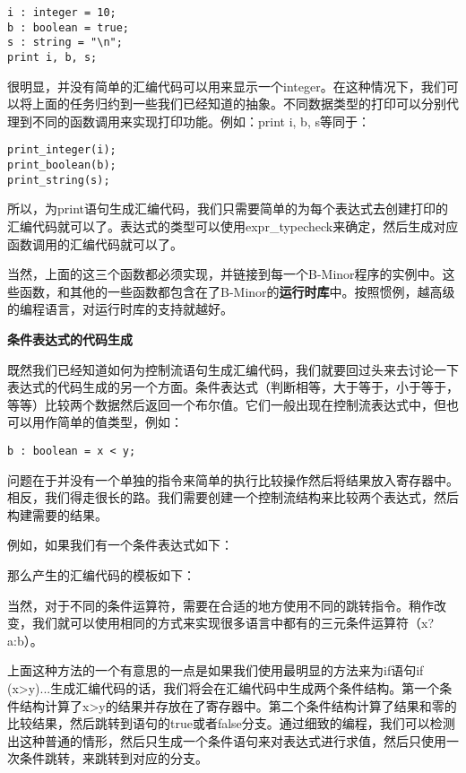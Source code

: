 \documentclass[cn,11pt,chinese]{elegantbook}
\begin{document}
\begin{verbatim}
i : integer = 10;
b : boolean = true;
s : string = "\n";
print i, b, s;
\end{verbatim}

很明显，并没有简单的汇编代码可以用来显示一个integer。在这种情况下，我们可以将上面的任务归约到一些我们已经知道的抽象。不同数据类型的打印可以分别代理到不同的函数调用来实现打印功能。例如：print i, b, s等同于：

\begin{verbatim}
print_integer(i);
print_boolean(b);
print_string(s);
\end{verbatim}

所以，为print语句生成汇编代码，我们只需要简单的为每个表达式去创建打印的汇编代码就可以了。表达式的类型可以使用expr\_typecheck来确定，然后生成对应函数调用的汇编代码就可以了。

当然，上面的这三个函数都必须实现，并链接到每一个B-Minor程序的实例中。这些函数，和其他的一些函数都包含在了B-Minor的\textbf{运行时库}中。按照惯例，越高级的编程语言，对运行时库的支持就越好。

\textbf{条件表达式的代码生成}

既然我们已经知道如何为控制流语句生成汇编代码，我们就要回过头来去讨论一下表达式的代码生成的另一个方面。条件表达式（判断相等，大于等于，小于等于，等等）比较两个数据然后返回一个布尔值。它们一般出现在控制流表达式中，但也可以用作简单的值类型，例如：

\begin{verbatim}
b : boolean = x < y;
\end{verbatim}

问题在于并没有一个单独的指令来简单的执行比较操作然后将结果放入寄存器中。相反，我们得走很长的路。我们需要创建一个控制流结构来比较两个表达式，然后构建需要的结果。

例如，如果我们有一个条件表达式如下：

那么产生的汇编代码的模板如下：

当然，对于不同的条件运算符，需要在合适的地方使用不同的跳转指令。稍作改变，我们就可以使用相同的方式来实现很多语言中都有的三元条件运算符（x?a:b）。

上面这种方法的一个有意思的一点是如果我们使用最明显的方法来为if语句if (x>y){...}生成汇编代码的话，我们将会在汇编代码中生成两个条件结构。第一个条件结构计算了x>y的结果并存放在了寄存器中。第二个条件结构计算了结果和零的比较结果，然后跳转到语句的true或者false分支。通过细致的编程，我们可以检测出这种普通的情形，然后只生成一个条件语句来对表达式进行求值，然后只使用一次条件跳转，来跳转到对应的分支。
\end{document}
